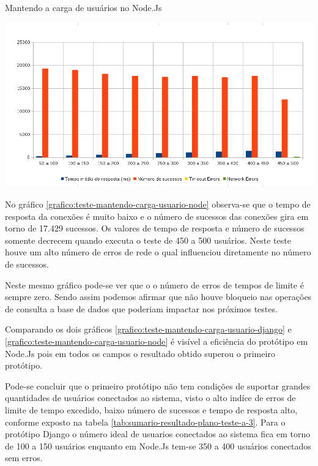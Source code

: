   \begin{grafico}[H]
    \setlength{\abovecaptionskip}{5pt}
    \setlength{\belowcaptionskip}{0pt}
    \label{grafico:teste-mantendo-carga-usuario-node}
    \caption[Mantendo a carga de usuários no Node.Js]
	    {Mantendo a carga de usuários no Node.Js}
    \centering
    \includegraphics[width=.80\textwidth]{imagem/graficos/grafico_node_plano_de_teste_3.png}
    \captionsetup[grafico]{justification=centering}
  \end{grafico}

  No gráfico \ref{grafico:teste-mantendo-carga-usuario-node}  observa-se que o tempo de resposta da conexões 
  é muito baixo e o número de sucessos das conexões gira em torno de 17.429 sucessos. Os valores de tempo de resposta e
  número de sucessos somente decrecem quando executa o teste de 450 a 500 usuários. Neste teste houve um alto número de erros 
  de rede o qual influenciou diretamente no número de sucessos.
  
  Neste mesmo gráfico pode-se ver que o o número de erros de tempos de limite é sempre zero. Sendo assim podemos afirmar
  que não houve bloqueio nas operações de consulta a base de dados que poderiam impactar nos próximos testes.
  
  Comparando os dois gráficos \ref{grafico:teste-mantendo-carga-usuario-django} e \ref{grafico:teste-mantendo-carga-usuario-node} é
  visível a eficiência do protótipo em Node.Js pois em todos os campos o resultado obtido superou o primeiro protótipo.
  
  Pode-se concluir que o primeiro protótipo não tem condições de suportar grandes quantidades de usuários conectados ao
  sistema, visto o alto indíce de erros de limite de tempo excedido, baixo número de sucessos e tempo de resposta alto, 
  conforme exposto na tabela \ref{tab:sumario-resultado-plano-teste-a-3}. Para o protótipo Django o número ideal de usuarios
  conectados ao sistema fica em torno de 100 a 150 usuários enquanto em Node.Js tem-se 350 a 400 usuários conectados sem 
  erros.
  
  